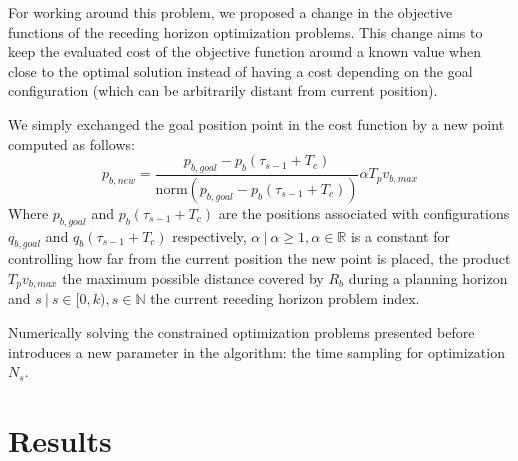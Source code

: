 For working around this problem, we proposed a change in the objective functions
of the receding horizon optimization problems. This change aims to keep the 
evaluated cost of the objective function around a known value when close to the optimal
solution instead of having a cost depending on the goal configuration (which can be arbitrarily distant from current position).

We simply exchanged the goal position point in the cost function by a new point computed as follows:
$$
    p_{b,new} = \frac{p_{b,goal} - p_{b}(\tau_{s-1}+T_c) }{\mathrm{norm}(p_{b,goal} - p_{b}(\tau_{s-1}+T_c) )} \alpha T_pv_{b,max}
$$
Where $p_{b,goal}$ and $p_{b}(\tau_{s-1}+T_c)$ are the positions associated with configurations $q_{b,goal}$ and $q_{b}(\tau_{s-1}+T_c)$ respectively, $\alpha\ |\ 
\alpha \geq 1, \alpha \in \mathbb{R}$ is a constant for controlling how far from the
current position the new point is placed, the product $T_pv_{b,max}$ the maximum possible distance covered by $R_b$ during a planning horizon and $s\ |\ s \in [0, k), s \in \mathbb{N}$ the current receding horizon problem index.

Numerically solving the constrained optimization problems presented before introduces
a new parameter in the algorithm: the time sampling for optimization $N_s$.









\chapter{Results}


